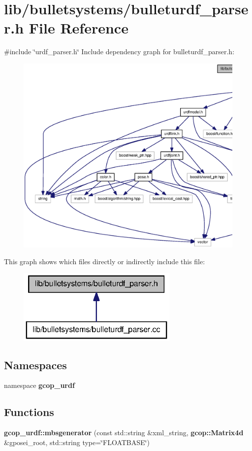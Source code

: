 \section{lib/bulletsystems/bulleturdf\-\_\-parser.h \-File \-Reference}
\label{bulleturdf__parser_8h}
{\ttfamily \#include \char`\"{}urdf\-\_\-parser.\-h\char`\"{}}\*
\-Include dependency graph for bulleturdf\-\_\-parser.\-h\-:
\nopagebreak
\begin{figure}[H]
\begin{center}
\leavevmode
\includegraphics[width=350pt]{bulleturdf__parser_8h__incl}
\end{center}
\end{figure}
\-This graph shows which files directly or indirectly include this file\-:
\nopagebreak
\begin{figure}[H]
\begin{center}
\leavevmode
\includegraphics[width=222pt]{bulleturdf__parser_8h__dep__incl}
\end{center}
\end{figure}
\subsection*{\-Namespaces}
\begin{DoxyCompactItemize}
\item 
namespace {\bf gcop\-\_\-urdf}
\end{DoxyCompactItemize}
\subsection*{\-Functions}
\begin{DoxyCompactItemize}
\item 
{\bf gcop\-\_\-urdf\-::mbsgenerator} (const std\-::string \&xml\-\_\-string, {\bf gcop\-::\-Matrix4d} \&gposei\-\_\-root, std\-::string type=\char`\"{}\-F\-L\-O\-A\-T\-B\-A\-S\-E\char`\"{})
\end{DoxyCompactItemize}
